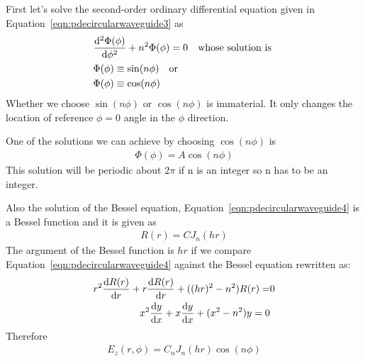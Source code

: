 First let's solve the second-order ordinary differential equation given in Equation~\ref{eqn:pdecircularwaveguide3} as
\begin{align*}
&\derivative[2]{\Phi(\phi)}{\phi} + n^2\Phi(\phi) = 0\quad\text{whose solution is }\\
&\Phi(\phi)\equiv\sin(n\phi)\quad\text{or}\\
&\Phi(\phi)\equiv\cos(n\phi)
\end{align*}
Whether we choose $\sin(n\phi)$ or $\cos(n\phi)$ is immaterial. It only changes the location of reference $\phi=0$ angle in the $\phi$ direction.

One of the solutions we can achieve by choosing $\cos(n\phi)$ is
\begin{align*}
\Phi(\phi)=A\cos(n\phi)
\end{align*}
This solution will be periodic about $2\pi$ if n is an integer so n has to be an integer.
  
Also the solution of the Bessel equation, Equation~\ref{eqn:pdecircularwaveguide4} is a Bessel function and it is given as
\begin{align*}
R(r)=CJ_n(hr)
\end{align*}
The argument of the Bessel function is $hr$ if we compare Equation~\eqref{eqn:pdecircularwaveguide4} against the Bessel equation rewritten as:
\begin{align*}
r^2\derivative{R(r)}{r} + r\derivative{R(r)}{r} + ((hr)^2 - n^2)R(r) =& 0\\
x^2\derivative{y}{x} + x\derivative{y}{x} + (x^2-n^2)y=0
\end{align*}
Therefore
\begin{align}
E_z(r,\phi) = C_nJ_n(hr)\cos(n\phi)\label{eqn:electricfieldsoln}
\end{align}

